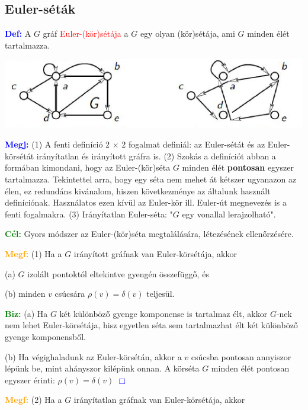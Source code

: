 \documentclass[../szamtud.tex]{subfiles}
\begin{document}
    \subsection{Euler-séták}

        \textcolor{blue}{\textbf{Def:}} A $G$ gráf \textcolor{red}{Euler-(kör)sétája} a $G$ egy olyan (kör)sétája, ami $G$ minden élét tartalmazza.

        \includegraphics[width=\textwidth]{img/1.png}

        \textcolor{blue}{\textbf{Megj:}} (1) A fenti definíció 2 $\times$ 2 fogalmat definiál: az Euler-sétát és az Euler-körsétát irányítatlan és irányított gráfra is. (2) Szokás a definíciót abban a formában kimondani, hogy az Euler-(kör)séta $G$ minden élét \textbf{pontosan} egyszer tartalmazza. Tekintettel arra, hogy egy séta nem mehet át kétszer ugyanazon az élen, ez redundáns kivánalom, hiszen következménye az általunk használt definíciónak. Használatos ezen kívül az Euler-kör ill. Euler-út megnevezés is a fenti fogalmakra. (3) Irányítatlan Euler-séta: "$G$ egy vonallal lerajzolható".

        \textcolor{green}{\textbf{Cél:}} Gyors módszer az Euler-(kör)séta megtalálására, létezésének ellenőrzésére.

        \textcolor{orange}{\textbf{Megf:}} (1) Ha a $G$ irányított gráfnak van Euler-körsétája, akkor 

            (a) $G$ izolált pontoktól eltekintve gyengén összefüggő, és 

            (b) minden $v$ csúcsára $\rho(v) = \delta(v)$ teljesül.

        \textcolor{green}{\textbf{Biz:}} (a) Ha $G$ két különböző gyenge komponense is tartalmaz élt, akkor $G$-nek nem lehet Euler-körsétája, hisz egyetlen séta sem tartalmazhat élt két különböző gyenge komponensből. \checkmark

        (b) Ha végighaladunk az Euler-körsétán, akkor a $v$ csúcsba pontosan annyiszor lépünk be, mint ahányszor kilépünk onnan. A körséta $G$ minden élét pontosan egyszer érinti: $\rho(v) = \delta(v)$  \textcolor{blue}{$\Box$} 

        \textcolor{orange}{\textbf{Megf:}} (2) Ha a $G$ irányítatlan gráfnak van Euler-körsétája, akkor 
\end{document}
